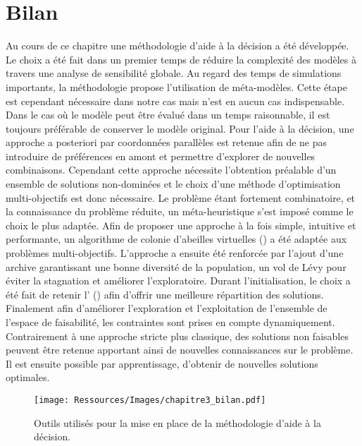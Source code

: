 

\section{Bilan} %
\label{sec:bilan}
Au cours de ce chapitre une méthodologie d’aide à la décision a été développée.
Le choix a été fait dans un premier temps de réduire la complexité des modèles à
travers une analyse de sensibilité globale. Au regard des temps de simulations
importants, la méthodologie propose l’utilisation de méta-modèles. Cette étape est
cependant nécessaire dans notre cas mais n’est en aucun cas indispensable. Dans le
cas où le modèle peut être évalué dans un temps raisonnable, il est toujours préférable
de conserver le modèle original. Pour l’aide à la décision, une approche a posteriori
par coordonnées parallèles est retenue afin de ne pas introduire de préférences en amont et permettre d’explorer
de nouvelles combinaisons. Cependant cette approche nécessite l’obtention préalable
d’un ensemble de solutions non-dominées et le choix d’une méthode d’optimisation
multi-objectifs est donc nécessaire. Le problème étant fortement combinatoire, et
la connaissance du problème réduite, un méta-heuristique s’est imposé comme le choix
le plus adaptée. Afin de proposer une approche à la fois simple, intuitive et performante,
un algorithme de colonie d’abeilles virtuelles () a été adaptée
aux problèmes multi-objectifs. L’approche a ensuite été renforcée par l’ajout d’une
archive garantissant une bonne diversité de la population, un vol de Lévy pour éviter
la stagnation et améliorer l’exploratoire. Durant l’initialisation, le choix a été
fait de retenir l’ () afin d’offrir une meilleure
répartition des solutions. Finalement afin d’améliorer l’exploration et l’exploitation
de l’ensemble de l’espace de faisabilité, les contraintes sont prises en compte
dynamiquement. Contrairement à une approche stricte plus classique,
des solutions non faisables peuvent être retenue apportant ainsi de nouvelles
connaissances sur le problème. Il est ensuite possible par apprentissage, d’obtenir de nouvelles
solutions optimales.
\begin{figure}
    \centering
    \texttt{[image: Ressources/Images/chapitre3\_bilan.pdf]}
    \caption[Outils utilisés pour la mise en place de la méthodologie d’aide à la décision]
            {Outils utilisés pour la mise en place de la méthodologie d’aide à la décision.}
    \label{fig:outils_methode}
\end{figure}

